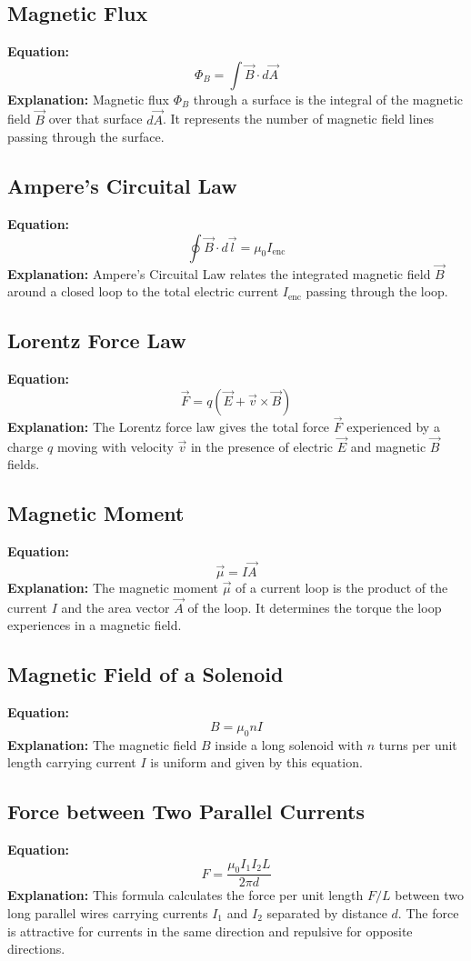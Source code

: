 \documentclass{article}
\begin{document}
\subsection*{Magnetic Flux}
\textbf{Equation:} 
\[ \Phi_B = \int \vec{B} \cdot d\vec{A} \]
\textbf{Explanation:} 
Magnetic flux \( \Phi_B \) through a surface is the integral of the magnetic field \( \vec{B} \) over that surface \( d\vec{A} \). It represents the number of magnetic field lines passing through the surface.

\subsection*{Ampere's Circuital Law}
\textbf{Equation:} 
\[ \oint \vec{B} \cdot d\vec{l} = \mu_0 I_{\text{enc}} \]
\textbf{Explanation:} 
Ampere's Circuital Law relates the integrated magnetic field \( \vec{B} \) around a closed loop to the total electric current \( I_{\text{enc}} \) passing through the loop.

\subsection*{Lorentz Force Law}
\textbf{Equation:} 
\[ \vec{F} = q(\vec{E} + \vec{v} \times \vec{B}) \]
\textbf{Explanation:} 
The Lorentz force law gives the total force \( \vec{F} \) experienced by a charge \( q \) moving with velocity \( \vec{v} \) in the presence of electric \( \vec{E} \) and magnetic \( \vec{B} \) fields.

\subsection*{Magnetic Moment}
\textbf{Equation:} 
\[ \vec{\mu} = I\vec{A} \]
\textbf{Explanation:} 
The magnetic moment \( \vec{\mu} \) of a current loop is the product of the current \( I \) and the area vector \( \vec{A} \) of the loop. It determines the torque the loop experiences in a magnetic field.

\subsection*{Magnetic Field of a Solenoid}
\textbf{Equation:} 
\[ B = \mu_0 n I \]
\textbf{Explanation:} 
The magnetic field \( B \) inside a long solenoid with \( n \) turns per unit length carrying current \( I \) is uniform and given by this equation.

\subsection*{Force between Two Parallel Currents}
\textbf{Equation:} 
\[ F = \frac{\mu_0 I_1 I_2 L}{2\pi d} \]
\textbf{Explanation:} 
This formula calculates the force per unit length \( F/L \) between two long parallel wires carrying currents \( I_1 \) and \( I_2 \) separated by distance \( d \). The force is attractive for currents in the same direction and repulsive for opposite directions.
\end{document}
